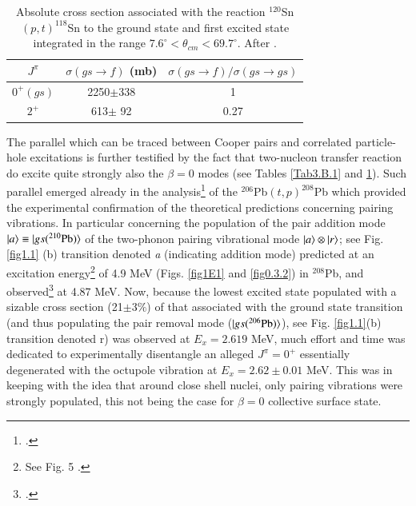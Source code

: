     \begin{table}
    	\begin{tabular}{|c|c|c|}
    		\hline
    		$J^{\pi}$& $\sigma(gs\rightarrow f)$ (mb) & $\sigma(gs\rightarrow f)/\sigma(gs\rightarrow gs)$  \\
    		\hline
    		$0^+(gs)$ & 2250$\pm$338& 1\\
    		$2^+$ & 613$\pm$ 92& 0.27\\
    		\hline
    	\end{tabular}\caption{Absolute cross section associated with the reaction $^{120}$Sn $(p,t)^{118}$Sn to the ground state and first excited state integrated in the range $7.6^\circ < \theta_{cm}<69.7^\circ$. After \cite{Guazzoni:08}.}\label{Tab3.B.2}
    \end{table}

 The parallel which can be traced between Cooper pairs and correlated particle-hole excitations is further testified by the fact that two-nucleon transfer reaction do excite quite strongly also the $\beta=0$ modes (see Tables \ref{Tab3.B.1} and \ref{Tab3.B.2}). 
Such parallel  emerged already in the analysis\footnote{\cite{Broglia:67}.} of the $^{206}$Pb$(t,p)^{208}$Pb which provided the experimental confirmation of the theoretical predictions concerning pairing vibrations. In particular concerning the population of the pair addition mode $|{a} \rangle\equiv|{gs(^{210}\text{Pb})} \rangle$ of the two-phonon pairing vibrational mode $|{a} \rangle\otimes|{r} \rangle$; see Fig. \ref{fig1.1} (b) transition denoted \emph{a} (indicating addition mode)  predicted at an excitation energy\footnote{See Fig. 5 \cite{Bes:66}.} of 4.9 MeV (Figs. \ref{fig1E1} and \ref{fig0.3.2}) in $^{208}$Pb, and observed\footnote{\cite{Bjerregaard:66b}.} at 4.87 MeV. Now, because the lowest excited state populated with a sizable cross section (21$\pm3\%$) of that associated with the ground state transition (and thus populating the pair removal mode ($|{gs(^{206}\text{Pb})} \rangle$), see Fig. \ref{fig1.1}(b) transition denoted r) was observed at $E_x=2.619$ MeV, much effort and time was dedicated to experimentally disentangle an alleged $J^\pi=0^+$ essentially degenerated with the octupole vibration at $E_x=2.62\pm0.01$ MeV.  This was in keeping with the idea that around close shell nuclei, only pairing vibrations were strongly populated, this not being the case for $\beta=0$ collective surface state. 

